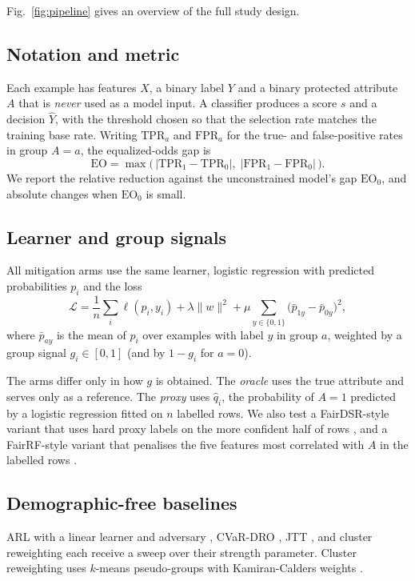 \documentclass[conference]{IEEEtran}
\newcommand{\EO}{\mathrm{EO}}
\newcommand{\TPR}{\mathrm{TPR}}
\newcommand{\FPR}{\mathrm{FPR}}
\begin{document}
Fig.~\ref{fig:pipeline} gives an overview of the full study design.

\subsection{Notation and metric}
Each example has features $X$, a binary label $Y$ and a binary protected attribute $A$ that is \emph{never} used as a model input. A classifier produces a score $s$ and a decision $\hat Y$, with the threshold chosen so that the selection rate matches the training base rate. Writing $\TPR_a$ and $\FPR_a$ for the true- and false-positive rates in group $A=a$, the equalized-odds gap is
\begin{equation}
\EO=\max\big(\,|\TPR_1-\TPR_0|,\;|\FPR_1-\FPR_0|\,\big).
\end{equation}
We report the relative reduction against the unconstrained model's gap $\EO_0$, and absolute changes when $\EO_0$ is small.

\subsection{Learner and group signals}
All mitigation arms use the same learner, logistic regression with predicted probabilities $p_i$ and the loss
\begin{equation}
\mathcal{L}=\frac{1}{n}\sum_{i}\ell(p_i,y_i)+\lambda\|w\|^2+\mu\sum_{y\in\{0,1\}}\big(\bar p_{1y}-\bar p_{0y}\big)^2,
\end{equation}
where $\bar p_{ay}$ is the mean of $p_i$ over examples with label $y$ in group $a$, weighted by a group signal $g_i\in[0,1]$ (and by $1-g_i$ for $a=0$).

The arms differ only in how $g$ is obtained. The \emph{oracle} uses the true attribute and serves only as a reference. The \emph{proxy} uses $\hat q_i$, the probability of $A=1$ predicted by a logistic regression fitted on $n$ labelled rows. We also test a FairDSR-style variant that uses hard proxy labels on the more confident half of rows \cite{kenfack2024fairness}, and a FairRF-style variant that penalises the five features most correlated with $A$ in the labelled rows \cite{zhao2022towards}.

\subsection{Demographic-free baselines}
ARL with a linear learner and adversary \cite{lahoti2020fairness}, CVaR-DRO \cite{levy2020large}, JTT \cite{liu2021just}, and cluster reweighting each receive a sweep over their strength parameter. Cluster reweighting uses $k$-means pseudo-groups with Kamiran-Calders weights \cite{kamiran2012data}.
\end{document}
